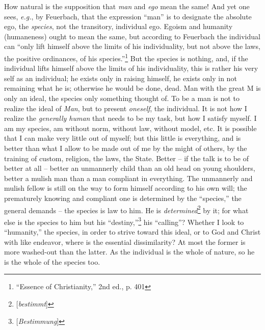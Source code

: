 How natural is the supposition that \textit{man} and \textit{ego} mean the 
same! And yet one sees, \textit{e.g.}, by Feuerbach, that the expression 
``man'' is to designate the absolute ego, the \textit{species}, not the 
transitory, individual ego. Egoism and humanity (humaneness) ought to mean the 
same, but according to Feuerbach the individual can ``only lift himself above 
the limits of his individuality, but not above the laws, the positive 
ordinances, of his species.''\footnote{``Essence of Christianity,'' 2nd 
ed., p. 401} But the species is nothing, and, if the individual lifts himself 
above the limits of his individuality, this is rather his very self as an 
individual; he exists only in raising himself, he exists only in not remaining 
what he is; otherwise he would be done, dead. Man with the great M is only an 
ideal, the species only something thought of. To be a man is not to realize 
the ideal of \textit{Man}, but to present \textit{oneself}, the individual. It 
is not how I realize the \textit{generally human} that needs to be my task, 
but how I satisfy myself. I am my species, am without norm, without law, 
without model, etc. It is possible that I can make very little out of myself; 
but this little is everything, and is better than what I allow to be made out 
of me by the might of others, by the training of custom, religion, the laws, 
the State. Better -- if the talk is to be of better at all -- better an 
unmannerly child than an old head on young shoulders, better a mulish man than 
a man compliant in everything. The unmannerly and mulish fellow is still on 
the way to form himself according to his own will; the prematurely knowing and 
compliant one is determined by the ``species,'' the general demands -- the 
species is law to him. He is \textit{determined}\footnote{[\textit{bestimmt}]} 
by it; for what else is the species to him but his 
``destiny,''\footnote{[\textit{Bestimmung}]} his ``calling''? Whether I 
look to ``humanity,'' the species, in order to strive toward this ideal, or 
to God and Christ with like endeavor, where is the essential dissimilarity? At 
most the former is more washed-out than the latter. As the individual is the 
whole of nature, so he is the whole of the species too.

